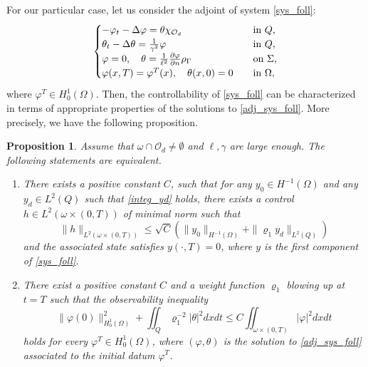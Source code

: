 \documentclass{dcds-bOF}
\newtheorem{proposition}{Proposition}
\theoremstyle{definition}
\def\csbd{\rho_{\Gamma}}
\begin{document}
For our particular case, let us consider the adjoint of system \eqref{sys_foll}:
%
\begin{equation}\label{adj_sys_foll}
\begin{cases}
-\varphi_t-\Delta \varphi= \theta\chi_{\mathcal O_d} \quad&\textnormal{in }Q, \\
\theta_t-\Delta \theta=\frac{1}{\gamma^2}\varphi \quad& \textnormal{in }Q, \\
\varphi=0, \quad \theta=\frac{1}{\ell^2}\frac{\partial \varphi}{\partial n}\csbd \quad &\textnormal{on $\Sigma$,} \\
\varphi(x,T)=\varphi^T(x), \quad \theta(x,0)=0 \quad &\textnormal{in $\Omega$},
\end{cases}
\end{equation}
%
where $\varphi^T\in H^{1}_0(\Omega)$. Then, the controllability of \eqref{sys_foll} can be characterized in terms of appropriate properties of the solutions to \eqref{adj_sys_foll}. More precisely, we have the following proposition.

\begin{proposition}\label{prop_control}
Assume that $\omega\cap\mathcal O_d\neq \emptyset$ and $\ell,\gamma$ are large enough. The following statements are equivalent.
%
\begin{enumerate}
\item There exists a positive constant $C$, such that for any $y_0\in H^{-1}(\Omega)$ and any $y_d\in L^2(Q)$ such that \eqref{integ_yd} holds, there exists a control $h\in L^2(\omega\times(0,T))$ of minimal norm such that
%
\begin{equation*}
\|h\|_{L^2(\omega\times(0,T))}\leq \sqrt C\left(\|y_0\|_{H^{-1}(\Omega)}+\|\varrho_1 y_d\|_{L^2(Q)}\right)
\end{equation*}
%
and the associated state satisfies $y(\cdot,T)=0$, where $y$ is the first component of \eqref{sys_foll}.
%
\item There exist a positive constant $C$ and a weight function $\varrho_1$ blowing up at $t=T$ such that the observability inequality
%
\begin{equation}\label{obs_ineq_1}
\|\varphi(0)\|_{H^1_{0}(\Omega)}^2+\iint_Q \varrho_1^{-2}|\theta|^2dxdt\leq C\iint_{\omega\times(0,T)}|\varphi|^2dxdt
\end{equation}
%
holds for every $\varphi^T\in H^1_{0}(\Omega)$, where $(\varphi,\theta)$ is the solution to \eqref{adj_sys_foll} associated to the initial datum $\varphi^T$.
\end{enumerate}
%
\end{proposition}
\end{document}
